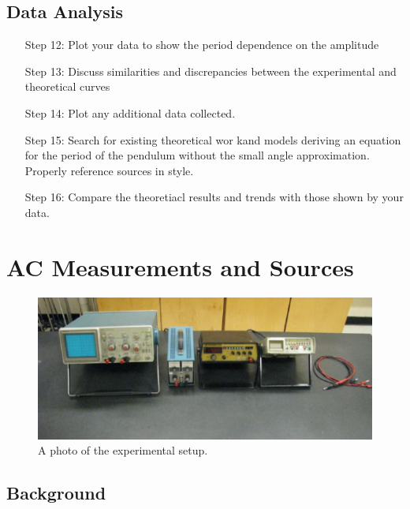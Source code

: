 \section{Data Analysis}


\begin{itemize}[leftmargin = 50pt]
    \item[Step 12:] Plot your data to show the period dependence on the amplitude
    \item[Step 13:] Discuss similarities and discrepancies between the experimental and theoretical curves
    \item[Step 14:] Plot any additional data collected.
    \item[Step 15:] Search for existing theoretical wor kand models deriving an equation for the period of the pendulum without the small angle approximation. Properly reference sources in  style.
    \item[Step 16:] Compare the theoretiacl results and trends with those shown by your data.
\end{itemize}






\chapter{AC Measurements and Sources}

\begin{figure}[H]
    \centering
    \includegraphics[scale = 0.8]{Images/ACDCSetup.PNG}
    \caption{A photo of the experimental setup.}
    \label{fig:ACDCSetup}
\end{figure}


\section{Background}

